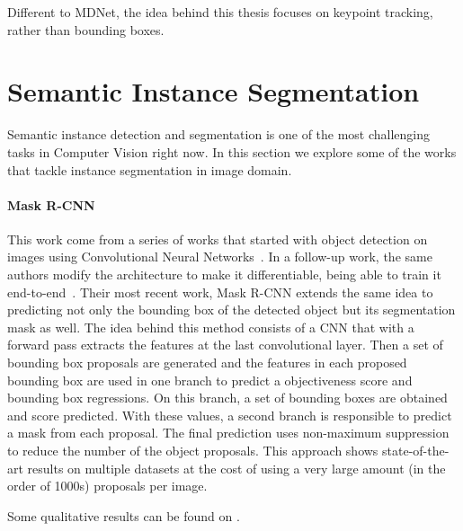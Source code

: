 Different to MDNet, the idea behind this thesis focuses on keypoint tracking, rather than bounding boxes.



\section{Semantic Instance Segmentation}
\label{sec:stateofart:semanticinstancesegmentation}

Semantic instance detection and segmentation is one of the most challenging tasks in Computer Vision right now.
In this section we explore some of the works that tackle instance segmentation in image domain.


\paragraph{Mask R-CNN~\maskrcnn{}}
This work come from a series of works that started with object detection on images using Convolutional Neural Networks~\fastrcnn{}.
In a follow-up work, the same authors modify the architecture to make it differentiable, being able to train it end-to-end~\fasterrcnn{}.
Their most recent work, Mask R-CNN extends the same idea to predicting not only the bounding box of the detected object but its segmentation mask as well.
The idea behind this method consists of a CNN that with a forward pass extracts the features at the last convolutional layer.
Then a set of bounding box proposals are generated and the features in each proposed bounding box are used in one branch to predict a objectiveness score and bounding box regressions.
On this branch, a set of bounding boxes are obtained and score predicted. With these values, a second branch is responsible to predict a mask from each proposal.
The final prediction uses non-maximum suppression to reduce the number of the object proposals.
This approach shows state-of-the-art results on multiple datasets at the cost of using a very large amount (in the order of 1000s) proposals per image.

Some qualitative results can be found on .

